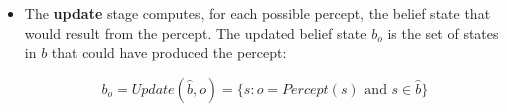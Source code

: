 \begin{questions}
\begin{solution}[3in]
\begin{itemize}
\vspace{-.1in}

\[
PossiblePercepts(\hat{b}) = \{o : o = Percept(s) \text{ and } s \in \hat{b}\}
\]

\item The {\bf update} stage computes, for each possible percept, the belief state that would result from the percept. The updated belief state $b_o$ is the set of states in $b$ that could have produced the percept:

\vspace{-.1in}

\[
b_o = Update(\hat{b},o) = \{s : o = Percept(s) \text{ and } s \in \hat{b}\}
\]



\end{itemize}

\end{solution}




\end{questions}



